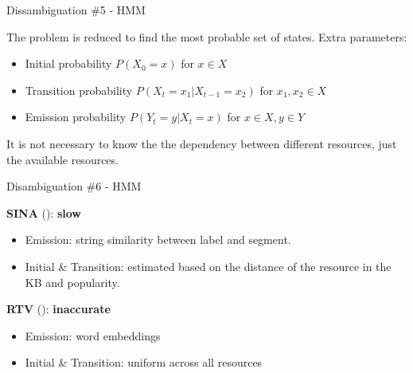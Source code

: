 \documentclass{beamer}
\begin{document}

\begin{frame}{Dissambiguation \#5 - HMM}
  \begin{card}
    The problem is reduced to find the most probable set of states. Extra parameters:
    \begin{itemize}
      \item Initial probability $P(X_{0} = x)$ for $x \in X$
      \item Transition probability $P(X_{t} = x_{1} | X_{t-1} = x_{2})$ for $x_{1}, x_{2} \in X$
      \item Emission probability $P(Y_{t} = y | X_{t} = x)$ for $x \in X, y \in Y$
    \end{itemize}
    It is not necessary to know the the dependency between different resources, just the available resources.
  \end{card}
\end{frame}

\note{}

\begin{frame}{Disambiguation \#6 - HMM}
  \begin{card}
    \textbf{SINA} (\cite{shekarpour2015a}): \textbf{slow}
    \begin{itemize}
      \item Emission: string similarity between label and segment.
      \item Initial \& Transition: estimated based on the distance of the resource in the KB and popularity.
    \end{itemize}
  \end{card}
  \begin{card}
    \textbf{RTV} (\cite{giannone2013a}): \textbf{inaccurate}
    \begin{itemize}
      \item Emission: word embeddings
      \item Initial \& Transition: uniform across all resources
    \end{itemize}
  \end{card}
\end{frame}

\end{document}
